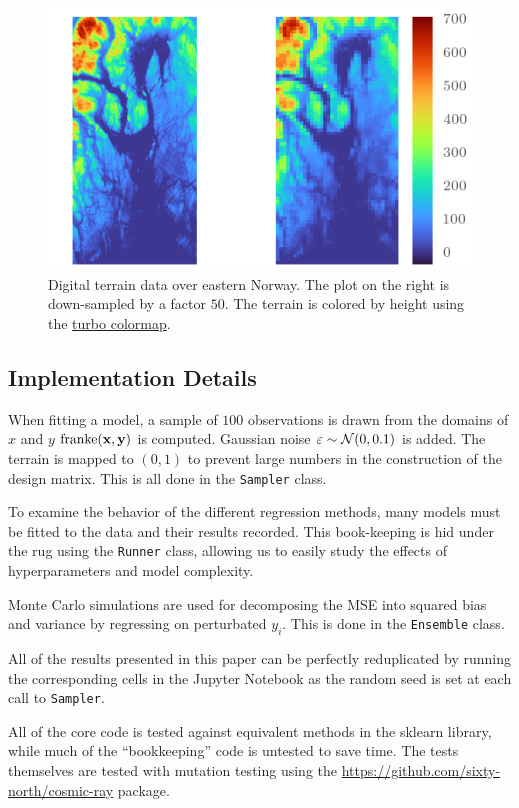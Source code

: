 \begin{figure}[]
  \centering
  \includegraphics[]{figures/terrain.png}
  \caption{\label{fig:terrain} Digital terrain data over eastern Norway. The plot on
    the right is down-sampled by a factor \(50\). The terrain is colored by
    height using the
    \href{https://ai.googleblog.com/2019/08/turbo-improved-rainbow-colormap-for.html}{turbo
    colormap}.}
\end{figure}


\subsection{Implementation Details}

When fitting a model, a sample of \(100\) observations is drawn from the domains
of \(x\) and \(y\)
\(\text{franke}(\vb{x}, \vb{y})\) is computed. Gaussian noise \(\vb{\varepsilon}
\sim \mathcal{N}(0, 0.1)\) is added. The terrain is mapped to \((0, 1)\) to
prevent large numbers in the construction of the design matrix. This is all done in the \texttt{Sampler}
class.


To examine the behavior of the different regression methods, many models must be
fitted to the data and their results recorded. This book-keeping is hid under the rug using the
\texttt{Runner} class, allowing us to easily study the effects of
hyperparameters and model complexity.


Monte Carlo simulations are used for decomposing the MSE into squared bias and
variance by regressing on perturbated \(y_{i}\). This is done in the
\texttt{Ensemble} class.


All of the results presented in this paper can be perfectly reduplicated by running the
corresponding cells in the Jupyter Notebook as the random seed is set at each
call to \texttt{Sampler}.

All of the core code is tested against equivalent methods in the sklearn
library, while much of the ``bookkeeping'' code is untested to save time. The
tests themselves are tested with mutation testing using the \href{Cosmic Ray}{https://github.com/sixty-north/cosmic-ray} package.